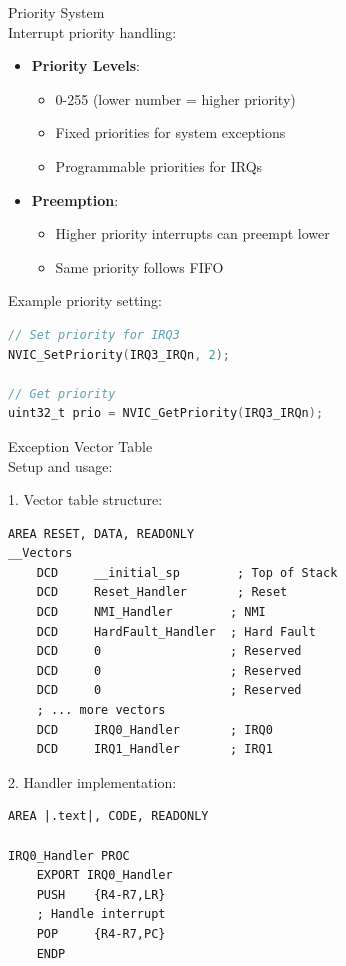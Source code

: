 \begin{concept}{Priority System}\\
Interrupt priority handling:
\begin{itemize}
  \item \textbf{Priority Levels}:
    \begin{itemize}
      \item 0-255 (lower number = higher priority)
      \item Fixed priorities for system exceptions
      \item Programmable priorities for IRQs
    \end{itemize}
  \item \textbf{Preemption}:
    \begin{itemize}
      \item Higher priority interrupts can preempt lower
      \item Same priority follows FIFO
    \end{itemize}
\end{itemize}

Example priority setting:
\begin{lstlisting}[language=C, style=base]
// Set priority for IRQ3
NVIC_SetPriority(IRQ3_IRQn, 2);

// Get priority
uint32_t prio = NVIC_GetPriority(IRQ3_IRQn);
\end{lstlisting}
\end{concept}

\begin{KR}{Exception Vector Table}\\
Setup and usage:

1. Vector table structure:
\begin{lstlisting}[language=armasm, style=base]
    AREA RESET, DATA, READONLY
__Vectors
    DCD     __initial_sp        ; Top of Stack
    DCD     Reset_Handler       ; Reset
    DCD     NMI_Handler        ; NMI
    DCD     HardFault_Handler  ; Hard Fault
    DCD     0                  ; Reserved
    DCD     0                  ; Reserved
    DCD     0                  ; Reserved
    ; ... more vectors
    DCD     IRQ0_Handler       ; IRQ0
    DCD     IRQ1_Handler       ; IRQ1
\end{lstlisting}

2. Handler implementation:
\begin{lstlisting}[language=armasm, style=base]
    AREA |.text|, CODE, READONLY
    
IRQ0_Handler PROC
    EXPORT IRQ0_Handler
    PUSH    {R4-R7,LR}
    ; Handle interrupt
    POP     {R4-R7,PC}
    ENDP
\end{lstlisting}
\end{KR}

